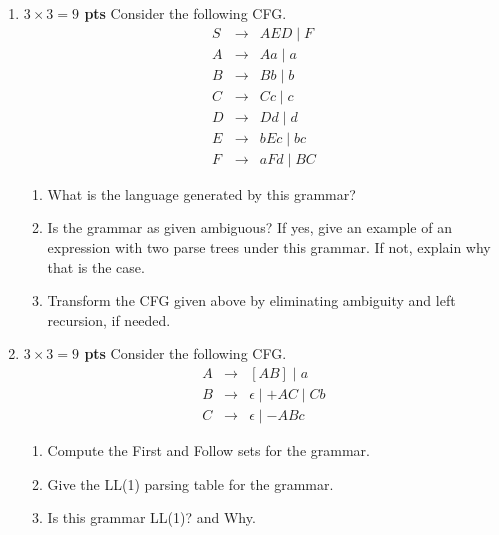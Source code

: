\documentclass[10pt]{article}
\newcommand {\pts}[1]{{\bf #1 pts}}
\begin{document}
\begin{enumerate}
   \newpage

\item \pts{$3\times 3= 9$} Consider the following CFG.
\[\begin{array}{cll}
S & \rightarrow & AED \mid F \\
A & \rightarrow & Aa \mid a \\
B & \rightarrow & Bb \mid b \\
C & \rightarrow & Cc \mid c \\
D & \rightarrow & Dd \mid d \\
E & \rightarrow & bEc \mid bc \\
F & \rightarrow & aFd \mid BC
\end{array}\]

\begin{enumerate}
\item What is the language generated by this grammar?
            \[
            \]
\item Is the grammar as given ambiguous? If yes, give an example of an expression
with two parse trees under this grammar. If not, explain why that is the case.
            \[
            \]
\item Transform the CFG given above by eliminating ambiguity and
left recursion, if needed.
            \[
            \]
\end{enumerate}


   \newpage
\item \pts{$3\times 3= 9$} Consider the following CFG.
\[\begin{array}{cll}
A & \rightarrow & [AB] \mid a \\
B & \rightarrow & \epsilon \mid +AC \mid Cb \\
C & \rightarrow & \epsilon \mid -ABc
\end{array}\]

\begin{enumerate}
  \item Compute the First and Follow sets for the grammar.
             \[
            \]
  \item Give the LL(1) parsing table for the grammar.
              \[
            \]
  \item Is this grammar LL(1)? and Why.
              \[
            \]
\end{enumerate}


\end{enumerate}
\end{document}
